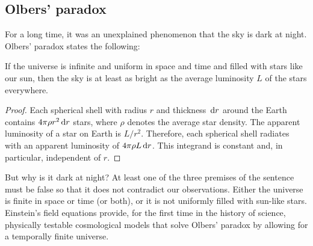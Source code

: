 \subsection{Olbers' paradox}
For a long time, it was an unexplained phenomenon that the sky is dark at night.
Olbers' paradox 
states the following:

\begin{satz}
	If the universe is infinite and uniform in space and time
    and filled with stars like our sun, 
    then the sky is at least
    as bright as the average luminosity $L$ of the stars everywhere.
\end{satz}
\begin{proof}
	\cite{Tipler-1988}
	Each spherical shell with radius $r$ and thickness $\,\mathrm{d} r$ around the Earth
    contains $4 \pi \rho r^2 \,\mathrm{d} r$ stars, where $\rho$ denotes the average star density.
    The apparent luminosity of a star on Earth is
    $L/r^2$.
	Therefore, each spherical shell 
    radiates with an apparent luminosity of $4 \pi \rho L \,\mathrm{d} r$.
    This integrand is constant and, in particular, independent of $r$.
\end{proof}

But why is it dark at night?
At least one of the three premises of the sentence must be false
so that it does not contradict our observations.
Either the universe is finite in space or time 
(or both),
or it is not uniformly filled with sun-like stars.
Einstein's field equations provide, for the first time in the
history of science, physically testable %
cosmological models
that solve Olbers' paradox by allowing for a temporally finite
universe.


